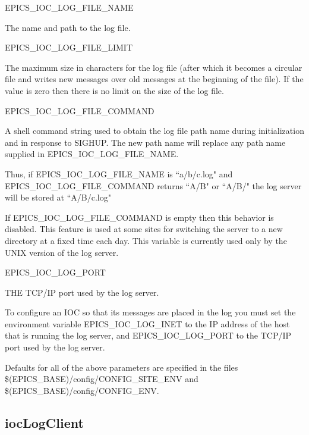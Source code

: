 \begin{description}

\item {}EPICS\_IOC\_LOG\_FILE\_NAME

The name and path to the log file.

\item {}EPICS\_IOC\_LOG\_FILE\_LIMIT

The maximum size in characters for the log file (after which it becomes a circular file and writes new messages over old messages at the beginning of the file).
If the value is zero then there is no limit on the size of the log file.

\item {}EPICS\_IOC\_LOG\_FILE\_COMMAND

A shell command string used to obtain the log file path name during initialization and in response to SIGHUP.
The new path name will replace any path name supplied in EPICS\_IOC\_LOG\_FILE\_NAME.

Thus, if EPICS\_IOC\_LOG\_FILE\_NAME is ``a/b/c.log" and EPICS\_IOC\_LOG\_FILE\_COMMAND returns ``A/B" or ``A/B/" the log server will be stored at ``A/B/c.log"

If EPICS\_IOC\_LOG\_FILE\_COMMAND is empty then this behavior is disabled.
This feature is used at some sites for switching the server to a new directory at a fixed time each day.
This variable is currently used only by the UNIX version of the log server.

\item {}EPICS\_IOC\_LOG\_PORT

THE TCP/IP port used by the log server.

\end{description}

To configure an IOC so that its messages are placed in the log you must set the environment variable EPICS\_IOC\_LOG\_INET to the IP address of the host that is running the log server, and EPICS\_IOC\_LOG\_PORT to the TCP/IP port used by the log server.

Defaults for all of the above parameters are specified in  the files \$(EPICS\_BASE)/config/CONFIG\_SITE\_ENV and \$(EPICS\_BASE)/config/CONFIG\_ENV.

\subsection{iocLogClient}
\label{iocLogClient}


